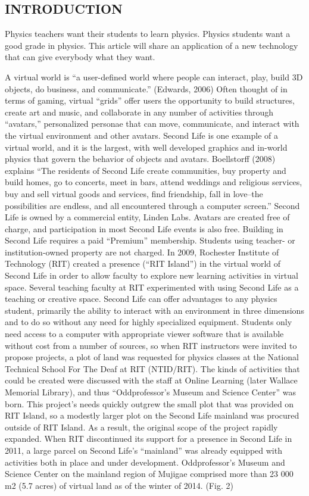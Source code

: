 \documentclass[11.5pt]{sig-alternate} %
\begin{document}
\begin{large}
\section*{INTRODUCTION}

Physics teachers want their students to learn physics. Physics students want a good grade in physics. This article will share an application of a new technology that can give everybody what they want.

A virtual world is “a user-defined world where people can interact, play, build 3D objects, do business, and communicate.” (Edwards, 2006) Often thought of in terms of gaming, virtual “grids” offer users the opportunity to build structures, create art and music, and collaborate in any number of activities through “avatars,” personalized personae that can move, communicate, and interact with the virtual environment and other avatars. Second Life is one example of a virtual world, and it is the largest, with well developed graphics and in-world physics that govern the behavior of objects and avatars. Boellstorff (2008) explains “The residents of Second Life create communities, buy property and build homes, go to concerts, meet in bars, attend weddings and religious services, buy and sell virtual goods and services, find friendship, fall in love--the possibilities are endless, and all encountered through a computer screen.” Second Life is owned by a commercial entity, Linden Labs. Avatars are created free of charge, and participation in most Second Life events is also free. Building in Second Life requires a paid “Premium” membership. Students using teacher- or institution-owned property are not charged. In 2009, Rochester Institute of Technology (RIT) created a presence (“RIT Island”) in the virtual world of Second Life in order to allow faculty to explore new learning activities in virtual space. Several teaching faculty at RIT experimented with using Second Life as a teaching or creative space. Second Life can offer advantages to any physics student, primarily the ability to interact with an environment in three dimensions and to do so without any need for highly specialized equipment. Students only need access to a computer with appropriate viewer software that is available without cost from a number of sources, so when RIT instructors were invited to propose projects, a plot of land was requested for physics classes at the National Technical School For The Deaf at RIT (NTID/RIT). The kinds of activities that could be created were discussed with the staff at Online Learning (later Wallace Memorial Library), and thus “Oddprofessor’s Museum and Science Center” was born. This project’s needs quickly outgrew the small plot that was provided on RIT Island, so a modestly larger plot on the Second Life mainland was procured outside of RIT Island. As a result, the original scope of the project rapidly expanded. When RIT discontinued its support for a presence in Second Life in 2011, a large parcel on Second Life’s “mainland” was already equipped with activities both in place and under development. Oddprofessor’s Museum and Science Center on the mainland region of Mujigae comprised more than 23 000 m2 (5.7 acres) of virtual land as of the winter of 2014. (Fig. 2)


\end{large}
\end{document}
